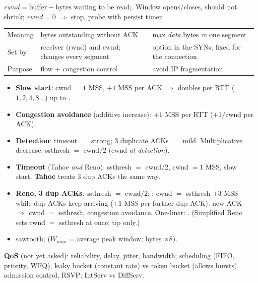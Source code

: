 \begin{multicols*}{3}
 
$rwnd=\text{buffer}-\text{bytes waiting to be read}$;\quad {}. Window opens/closes, should not shrink; $rwnd=0$ $\Rightarrow$ stop, probe with persist timer.
\begin{center}\scriptsize\zebra
\begin{tabularx}{\linewidth}{@{}L{11mm}YY@{}}\toprule
 &  & \\\midrule
Meaning & bytes outstanding without ACK & max \emph{data} bytes in one segment\\
Set by & receiver (rwnd) and cwnd; changes every segment & option in the SYNs; fixed for the connection\\
Purpose & flow + congestion control & avoid IP fragmentation\\\bottomrule
\end{tabularx}
\end{center}

 
\begin{itemize}
  \item \textbf{Slow start}: cwnd $=1$ MSS, $+1$ MSS per ACK $\Rightarrow$ doubles per RTT ($1,2,4,8\dots$) up to .
  \item \textbf{Congestion avoidance} (additive increase): $+1$ MSS per RTT ($+1/\text{cwnd}$ per ACK).
  \item \textbf{Detection}: timeout $=$ strong; 3 duplicate ACKs $=$ mild. Multiplicative decrease: ssthresh $=$ cwnd$/2$ (cwnd \emph{at detection}).
  \item \textbf{Timeout} (Tahoe \emph{and} Reno): ssthresh $=$ cwnd$/2$, cwnd $=1$ MSS, slow start. \textbf{Tahoe} treats 3 dup ACKs the same way.
  \item \textbf{Reno, 3 dup ACKs}: ssthresh $=$ cwnd$/2$; : cwnd $=$ ssthresh $+3$ MSS while dup ACKs keep arriving ($+1$ MSS per further dup ACK); new ACK $\Rightarrow$ cwnd $=$ ssthresh, congestion avoidance. One-liner: . (Simplified Reno sets cwnd $=$ ssthresh at once: tip only.)
  \item {} sawtooth;  ($W_{max}$ = average peak window; bytes $\times8$).
\end{itemize}
\textbf{QoS} (not yet asked): reliability, delay, jitter, bandwidth; scheduling (FIFO, priority, WFQ), leaky bucket (constant rate) vs token bucket (allows bursts), admission control, RSVP; IntServ vs DiffServ.


\end{multicols*}
